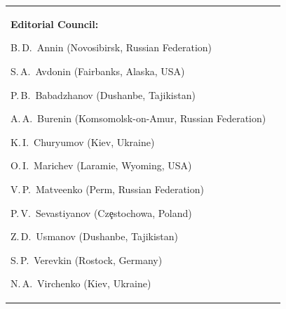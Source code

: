 \begin{table}[t!]
\begin{center}
\begin{tabular}{p{7cm}p{6cm}}
{\textbf{Editorial Council:}
\par \smallskip
B.\,D.~Annin (Novosibirsk, Russian Federation) \par
S.\,A.~Avdonin (Fairbanks, Alaska, USA) \par
P.\,B.~Babadzhanov (Dushanbe, Tajikistan) \par
A.\,A.~Burenin (Komsomolsk-on-Amur, Russian Federation) \par
K.\,I.~Churyumov (Kiev, Ukraine) \par
O.\,I.~Marichev  (Laramie, Wyoming, USA) \par
V.\,P.~Matveenko (Perm, Russian Federation) \par
P.\,V.~Sevastiyanov (Cz\c{e}stochowa, Poland)  \par
Z.\,D.~Usmanov  (Dushanbe, Tajikistan) \par
S.\,P.~Verevkin  (Rostock, Germany) \par
N.\,A.~Virchenko (Kiev, Ukraine) \par

%


\smallskip

}
\end{tabular}
\end{center}
\end{table}
